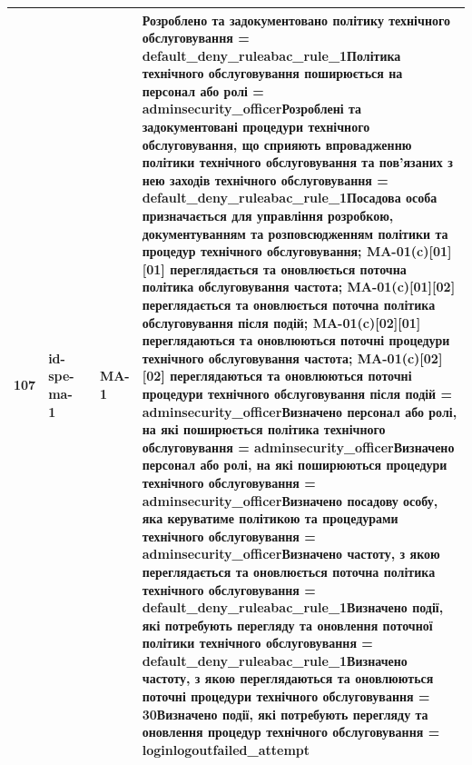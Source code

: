 \documentclass[10pt]{article}
\begin{document}
\begin{longtable}{|c|>{\raggedright\arraybackslash}p{2.5cm}|>{\raggedright\arraybackslash}p{4.5cm}|>{\raggedright\arraybackslash}p{3cm}|>{\raggedright\arraybackslash}p{4.5cm}|}
107 & id-spe-ma-1 &  & MA-1 & Розроблено та задокументовано політику технічного обслуговування = \textbf{default\_\allowbreak{}deny\_\allowbreak{}ruleabac\_\allowbreak{}rule\_\allowbreak{}1}\newline Політика технічного обслуговування поширюється на персонал або ролі = \textbf{adminsecurity\_\allowbreak{}officer}\newline Розроблені та задокументовані процедури технічного обслуговування, що сприяють впровадженню політики технічного обслуговування та пов'язаних з нею заходів технічного обслуговування = \textbf{default\_\allowbreak{}deny\_\allowbreak{}ruleabac\_\allowbreak{}rule\_\allowbreak{}1}\newline Посадова особа призначається для управління розробкою, документуванням та розповсюдженням політики та процедур технічного обслуговування; MA-01(c)[01][01] переглядається та оновлюється поточна політика обслуговування частота; MA-01(c)[01][02] переглядається та оновлюється поточна політика обслуговування після подій; MA-01(c)[02][01] переглядаються та оновлюються поточні процедури технічного обслуговування частота; MA-01(c)[02][02] переглядаються та оновлюються поточні процедури технічного обслуговування після подій = \textbf{adminsecurity\_\allowbreak{}officer}\newline Визначено персонал або ролі, на які поширюється політика технічного обслуговування = \textbf{adminsecurity\_\allowbreak{}officer}\newline Визначено персонал або ролі, на які поширюються процедури технічного обслуговування = \textbf{adminsecurity\_\allowbreak{}officer}\newline Визначено посадову особу, яка керуватиме політикою та процедурами технічного обслуговування = \textbf{adminsecurity\_\allowbreak{}officer}\newline Визначено частоту, з якою переглядається та оновлюється поточна політика технічного обслуговування = \textbf{default\_\allowbreak{}deny\_\allowbreak{}ruleabac\_\allowbreak{}rule\_\allowbreak{}1}\newline Визначено події, які потребують перегляду та оновлення поточної політики технічного обслуговування = \textbf{default\_\allowbreak{}deny\_\allowbreak{}ruleabac\_\allowbreak{}rule\_\allowbreak{}1}\newline Визначено частоту, з якою переглядаються та оновлюються поточні процедури технічного обслуговування = \textbf{30}\newline Визначено події, які потребують перегляду та оновлення процедур технічного обслуговування = \textbf{loginlogoutfailed\_\allowbreak{}attempt} \\ \hline

\end{longtable}
\end{document}
